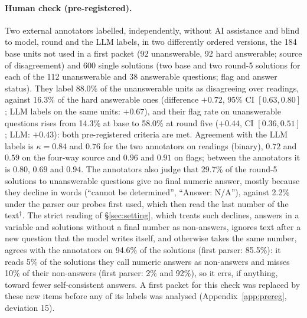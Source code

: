 \paragraph{Human check (pre-registered).} Two external annotators labelled, independently, without AI assistance and blind to model, round and the LLM labels, in two differently ordered versions, the 184 base units not used in a first packet (92 unanswerable, 92 hard answerable; source of disagreement) and 600 single solutions (two base and two round-5 solutions for each of the 112 unanswerable and 38 answerable questions; flag and answer status). They label 88.0\% of the unanswerable units as disagreeing over readings, against 16.3\% of the hard answerable ones (difference $+0.72$, 95\% CI $[0.63, 0.80]$; LLM labels on the same units: $+0.67$), and their flag rate on unanswerable questions rises from 14.3\% at base to 58.0\% at round five ($+0.44$, CI $[0.36, 0.51]$; LLM: $+0.43$): both pre-registered criteria are met. Agreement with the LLM labels is $\kappa{=}0.84$ and $0.76$ for the two annotators on readings (binary), $0.72$ and $0.59$ on the four-way source and $0.96$ and $0.91$ on flags; between the annotators it is $0.80$, $0.69$ and $0.94$. The annotators also judge that 29.7\% of the round-5 solutions to unanswerable questions give no final numeric answer, mostly because they decline in words (``cannot be determined'', ``Answer: N/A''), against 2.2\% under the parser our probes first used, which then read the last number of the text$^{\dagger}$. The strict reading of \S\ref{sec:setting}, which treats such declines, answers in a variable and solutions without a final number as non-answers, ignores text after a new question that the model writes itself, and otherwise takes the same number, agrees with the annotators on 94.6\% of the solutions (first parser: 85.5\%): it reads 5\% of the solutions they call numeric answers as non-answers and misses 10\% of their non-answers (first parser: 2\% and 92\%), so it errs, if anything, toward fewer self-consistent answers. A first packet for this check was replaced by these new items before any of its labels was analysed (Appendix~\ref{app:prereg}, deviation 15).

